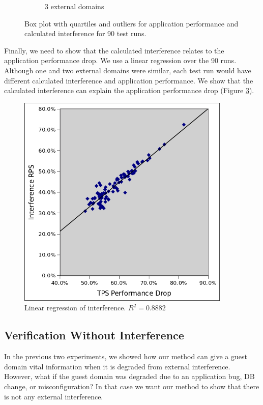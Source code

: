\begin{figure}[!h]
\begin{subfigure}[b]{0.3\textwidth}
                \caption{3 external domains}
                \label{fig:box4}
        \end{subfigure}
  	\caption{Box plot with quartiles and outliers for application performance and calculated interference for 90 test runs.}        
	\label{fig:stats1}
\end{figure}

Finally, we need to show that the calculated interference relates to the application performance drop.  We use a linear regression over the 90 runs.  Although one and two external domains were similar, each test run would have different calculated interference and application performance.  We show that the calculated interference can explain the application performance drop (Figure \ref{fig:regression}).

\begin{figure}[!h]
  \begin{center}
  \includegraphics[width=4in]{images/scatterPlot.png}
  \caption{Linear regression of interference.  $R^2 = 0.8882$ }
  \label{fig:regression}
  \end{center}
\end{figure}


\subsection{Verification Without Interference}
In the previous two experiments, we showed how our method can give a guest domain vital information when it is degraded from external interference.  However, what if the guest domain was degraded due to an application bug, DB change, or misconfiguration?   In that case we want our method to show that there is not any external interference.

